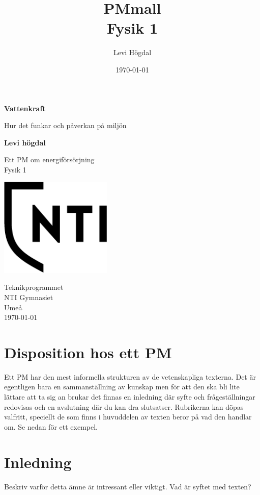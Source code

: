 \documentclass[11p]{article}
\title{PMmall \\ \small Fysik 1}
\author{Levi Högdal }
\date{\today}
\begin{document}
 \begin{titlepage}
  \begin{center}
   \vspace*{1cm}

   \Huge
   \textbf{Vattenkraft}

   \vspace{0.5cm}
   \LARGE
   Hur det funkar och påverkan på miljön

   \vspace{1.5cm}

   \textbf{Levi högdal}

   \vfill

   Ett PM om energiförsörjning \\
   Fysik 1

   \vspace{0.8cm}

   \includegraphics[width=0.4\textwidth]{NTI Gymnasiet_Symbol_print_svart.png}

   \Large
   Teknikprogrammet\\
   NTI Gymnasiet\\
   Umeå\\
   \today

  \end{center}
 \end{titlepage}
 \tableofcontents
 \newpage
 \section{Disposition hos ett PM}
 Ett PM har den mest informella strukturen av de vetenskapliga texterna. Det är egentligen bara en sammanställning av kunskap men för att den ska bli lite lättare att ta sig an brukar det finnas en inledning där syfte och frågeställningar redovisas och en avslutning där du kan dra slutsatser. Rubrikerna kan döpas valfritt, speciellt de som finns i huvuddelen av texten beror på vad den handlar om. Se nedan för ett exempel.

 \section{Inledning}
 Beskriv varför detta ämne är intressant eller viktigt. Vad är syftet med texten?
\end{document}
